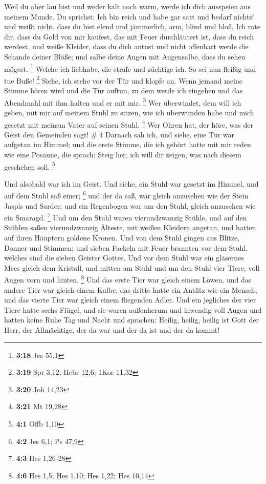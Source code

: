  Weil du aber lau bist und weder kalt noch warm, werde ich
dich ausspeien aus meinem Munde.  Du sprichst: Ich bin
reich und habe gar satt und bedarf nichts! und weißt nicht, dass du bist
elend und jämmerlich, arm, blind und bloß.  Ich rate dir,
dass du Gold von mir kaufest, das mit Feuer durchläutert ist, dass du
reich werdest, und weiße Kleider, dass du dich antust und nicht
offenbart werde die Schande deiner Blöße; und salbe deine Augen mit
Augensalbe, dass du sehen mögest. \footnote{\textbf{3:18} Jes 55,1}
 Welche ich liebhabe, die strafe und züchtige ich. So sei
nun fleißig und tue Buße! \footnote{\textbf{3:19} Spr 3,12; Hebr 12,6;
  1Kor 11,32}  Siehe, ich stehe vor der Tür und klopfe an.
Wenn jemand meine Stimme hören wird und die Tür auftun, zu dem werde ich
eingehen und das Abendmahl mit ihm halten und er mit mir. \footnote{\textbf{3:20}
  Joh 14,23}  Wer überwindet, dem will ich geben, mit mir
auf meinem Stuhl zu sitzen, wie ich überwunden habe und mich gesetzt mit
meinem Vater auf seinen Stuhl. \footnote{\textbf{3:21} Mt 19,28}
 Wer Ohren hat, der höre, was der Geist den Gemeinden sagt!
\# 4  Darnach sah ich, und siehe, eine Tür war aufgetan im
Himmel; und die erste Stimme, die ich gehört hatte mit mir reden wie
eine Posaune, die sprach: Steig her, ich will dir zeigen, was nach
diesem geschehen soll. \footnote{\textbf{4:1} Offb 1,10}

 Und alsobald war ich im Geist. Und siehe, ein Stuhl war
gesetzt im Himmel, und auf dem Stuhl saß einer; \footnote{\textbf{4:2}
  Jes 6,1; Ps 47,9}  und der da saß, war gleich anzusehen
wie der Stein Jaspis und Sarder; und ein Regenbogen war um den Stuhl,
gleich anzusehen wie ein Smaragd. \footnote{\textbf{4:3} Hes 1,26-28}
 Und um den Stuhl waren vierundzwanzig Stühle, und auf den
Stühlen saßen vierundzwanzig Älteste, mit weißen Kleidern angetan, und
hatten auf ihren Häuptern goldene Kronen.  Und von dem Stuhl
gingen aus Blitze, Donner und Stimmen; und sieben Fackeln mit Feuer
brannten vor dem Stuhl, welches sind die sieben Geister Gottes.
 Und vor dem Stuhl war ein gläsernes Meer gleich dem
Kristall, und mitten am Stuhl und um den Stuhl vier Tiere, voll Augen
vorn und hinten. \footnote{\textbf{4:6} Hes 1,5; Hes 1,10; Hes 1,22; Hes
  10,14}  Und das erste Tier war gleich einem Löwen, und das
andere Tier war gleich einem Kalbe, das dritte hatte ein Antlitz wie ein
Mensch, und das vierte Tier war gleich einem fliegenden Adler.
 Und ein jegliches der vier Tiere hatte sechs Flügel, und
sie waren außenherum und inwendig voll Augen und hatten keine Ruhe Tag
und Nacht und sprachen: Heilig, heilig, heilig ist Gott der Herr, der
Allmächtige, der da war und der da ist und der da kommt!

